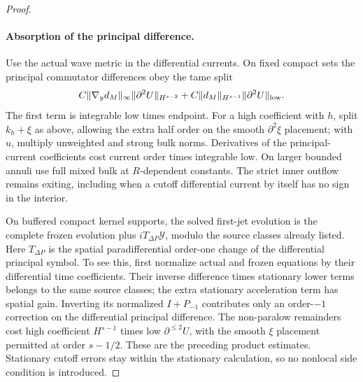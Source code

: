 \begin{proof}
\paragraph{Absorption of the principal difference.}
Use the actual wave metric in the differential currents.  On fixed compact
sets the principal commutator differences obey the tame split
\begin{equation}\label{co2:principal-commutator}
 C\|\nabla_y d_M\|_\infty\|\partial^2U\|_{H^{s-2}}
       +C\|d_M\|_{H^{s-1}}\|\partial^2U\|_{\rm low}.
\end{equation}
The first term is integrable low times endpoint.  For a high coefficient
with $h$, split $k_h+\xi$ as above, allowing the extra half order on the
smooth $\partial^2\xi$ placement; with $u$, multiply unweighted and strong
bulk norms.  Derivatives of the principal-current coefficients cost current
order times integrable low.  On larger bounded annuli use full mixed bulk at
$R$-dependent constants.  The strict inner outflow remains exiting, including
when a cutoff differential current by itself has no sign in the interior.

On buffered compact kernel supports, the solved first-jet evolution is the
complete frozen evolution plus $iT_{\Delta P}\mathcal Y$, modulo the source
classes already listed.  Here $T_{\Delta P}$ is the spatial paradifferential
order-one change of the differential principal symbol.  To see this, first
normalize actual and frozen equations by their differential time coefficients.
Their inverse difference times stationary lower terms belongs to the same
source classes; the extra stationary acceleration term has spatial gain.
Inverting its normalized $I+P_{-1}$ contributes only an order-$-1$
correction on the differential principal difference.  The non-paralow
remainders cost high coefficient $H^{s-1}$ times low $\partial^{\le2}U$,
with the smooth $\xi$ placement permitted at order $s-1/2$.  These are the
preceding product estimates.  Stationary cutoff errors stay within the
stationary calculation, so no nonlocal side condition is introduced.


\end{proof}
